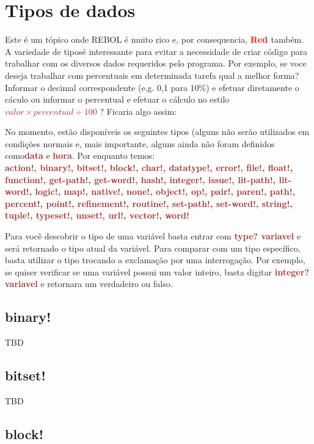 \documentclass[12pt,a4paper]{article}
\newcommand{\incss}[1]{
  \ttfamily\small
  \begin{shaded}
    \VerbatimInput{./fragmentos/#1.ss}
  \end{shaded}
  \normalfont
}
\newcommand{\Red}{\textbf{\textcolor{red}{Red }}}
\newcommand{\codigo}[1]{\ttfamily\small\textcolor{Brown}{\textbf{#1}}\normalfont}
\begin{document}
\section{Tipos de dados}

Este é um tópico onde REBOL é muito rico e, por consequencia, \Red também. A
variedade de tiposé interessante para evitar a necessidade de criar código para
trabalhar com os diversos dados requeridos pelo programa. Por exemplo, se voce
deseja trabalhar com percentuais em determinada tarefa qual a melhor forma?
Informar o decimal correspondente (e.g. 0,1 para 10\%) e efetuar diretamente o
cáculo ou informar o percentual e efetuar o cálculo no estilo \codigo{$valor \times 
  percentual \div 100$} ? Ficaria algo assim:

\incss{repl-percent}

No momento, estão disponíveis os seguintes tipos (alguns não serão utilizados em
condições normais e, mais importante, alguns ainda não foram definidos
como\codigo{data} e \codigo{hora}. Por enquanto temos:\\
\codigo{action!, binary!, bitset!, block!, char!, datatype!, error!, file!, float!,
function!, get-path!, get-word!, hash!, integer!, issue!, lit-path!, lit-word!,
logic!, map!, native!, none!, object!, op!, pair!, paren!, path!, percent!,
point!, refinement!, routine!, set-path!,  set-word!, string!, tuple!,
typeset!, unset!, url!, vector!, word!}

Para você descobrir o tipo de uma variável basta entrar com \codigo{type?
  variavel} e será retornado o tipo atual da variável. Para comparar com um tipo
específico, basta utilizar o tipo trocando a exclamação por uma interrogação.
Por exemplo, se quiser verificar se uma variável possui um valor inteiro, basta
digitar \codigo{integer? variavel} e retornara um verdadeiro ou falso.

\subsection{binary!}

TBD

\subsection{bitset!}

TBD

\subsection{block!}
\end{document}
